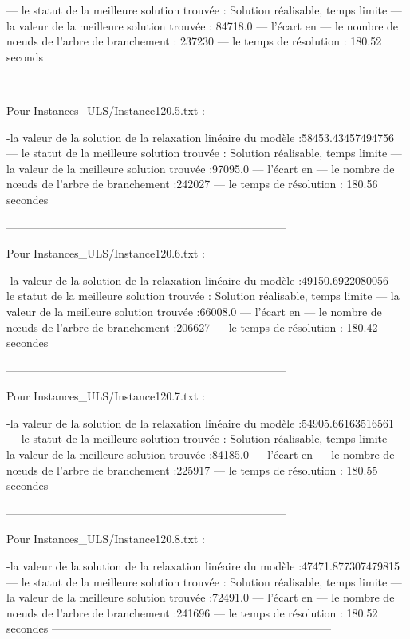 — le statut de la meilleure solution trouvée : Solution réalisable, temps limite
— la valeur de la meilleure solution trouvée : 84718.0
— l’écart en %
— le nombre de nœuds de l’arbre de branchement : 237230
— le temps de résolution : 180.52 seconds

---------------------------------------------------------------------------

Pour Instances_ULS/Instance120.5.txt :


-la valeur de la solution de la relaxation linéaire du modèle :58453.43457494756
— le statut de la meilleure solution trouvée : Solution réalisable, temps limite
— la valeur de la meilleure solution trouvée :97095.0
— l’écart en %
— le nombre de nœuds de l’arbre de branchement :242027
— le temps de résolution : 180.56 secondes


---------------------------------------------------------------------------

Pour Instances_ULS/Instance120.6.txt :


-la valeur de la solution de la relaxation linéaire du modèle :49150.6922080056
— le statut de la meilleure solution trouvée : Solution réalisable, temps limite
— la valeur de la meilleure solution trouvée :66008.0 
— l’écart en %
— le nombre de nœuds de l’arbre de branchement :206627
— le temps de résolution : 180.42 secondes

---------------------------------------------------------------------------

Pour Instances_ULS/Instance120.7.txt :


-la valeur de la solution de la relaxation linéaire du modèle :54905.66163516561
— le statut de la meilleure solution trouvée : Solution réalisable, temps limite
— la valeur de la meilleure solution trouvée :84185.0 
— l’écart en %
— le nombre de nœuds de l’arbre de branchement :225917
— le temps de résolution : 180.55 secondes

---------------------------------------------------------------------------

Pour Instances_ULS/Instance120.8.txt :


-la valeur de la solution de la relaxation linéaire du modèle :47471.877307479815
— le statut de la meilleure solution trouvée : Solution réalisable, temps limite
— la valeur de la meilleure solution trouvée :72491.0
— l’écart en %
— le nombre de nœuds de l’arbre de branchement :241696
— le temps de résolution : 180.52 secondes
---------------------------------------------------------------------------


